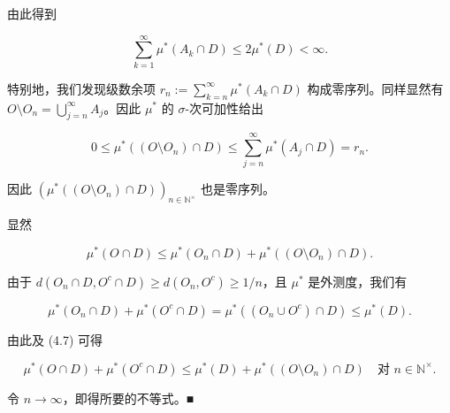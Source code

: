 \begin{theorem}
\begin{subitems}
由此得到

\[
\sum_{k=1}^{\infty} \mu^*(A_k \cap D) \le 2\mu^*(D) < \infty .
\]

特别地，我们发现级数余项 $ r_n := \sum_{k=n}^{\infty} \mu^*(A_k \cap D) $ 构成零序列。同样显然有 $ O \setminus O_n = \bigcup_{j=n}^{\infty} A_j $。因此 $ \mu^* $ 的 $ \sigma $-次可加性给出

\[
0 \le \mu^*((O \setminus O_n) \cap D) \le \sum_{j=n}^{\infty} \mu^*(A_j \cap D) = r_n .
\]

因此 $ \left(\mu^*((O \setminus O_n) \cap D)\right)_{n \in \mathbb{N}^{\times}} $ 也是零序列。

\item[（iv）]

显然

\begin{equation}
\mu^*(O \cap D) \le \mu^*(O_n \cap D) + \mu^*((O \setminus O_n) \cap D) .\tag{4.7}
\end{equation}

由于 $ d(O_n \cap D, O^c \cap D) \ge d(O_n, O^c) \ge 1/n $，且 $ \mu^* $ 是外测度，我们有

\[
\mu^*(O_n \cap D) + \mu^*(O^c \cap D) = \mu^*((O_n \cup O^c) \cap D) \le \mu^*(D) .
\]

由此及 (4.7) 可得

\[
\mu^*(O \cap D) + \mu^*(O^c \cap D) \le \mu^*(D) + \mu^*((O \setminus O_n) \cap D) \quad\text{对 } n \in \mathbb{N}^{\times} .
\]

令 $ n \to \infty $，即得所要的不等式。\nobreak\hspace{0.35em}■

\end{subitems}

\end{theorem}

